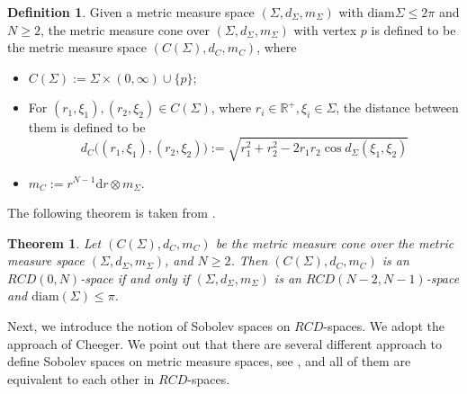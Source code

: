 \documentclass{article}
\newtheorem{theorem}{Theorem}[section]
\theoremstyle{remark}
\numberwithin{equation}{section}
\theoremstyle{definition}
\newtheorem{definition}{Definition}[section]
\begin{document}
     \begin{definition}
     	Given a metric measure space $(\Sigma,d_{\Sigma},m_{\Sigma})$ with $\mathrm{diam}\Sigma \le 2\pi$ and $N \ge 2$, the metric measure cone over $(\Sigma,d_{\Sigma},m_{\Sigma})$ with vertex $p$ is defined to be the metric measure space $(C(\Sigma),d_{C},m_{C})$, where
     	\begin{itemize}
     		\item $C(\Sigma) := \Sigma \times (0,\infty) \cup \{p\}$;
     		\item For $(r_{1},\xi_{1}),(r_{2},\xi_{2}) \in C(\Sigma)$, where $r_{i} \in \mathbb{R}^{+}, \xi_{i} \in \Sigma$, the distance between them is defined to be
     		\begin{equation}
     			d_{C}\big((r_{1},\xi_{1}),(r_{2},\xi_{2})\big) := \sqrt{r_{1}^{2} + r_{2}^{2} - 2r_{1}r_{2}\cos d_{\Sigma}(\xi_{1},\xi_{2})}
     		\end{equation}
     	    \item $m_{C} := r^{N-1}\mathrm{d}r \otimes m_{\Sigma}$.
     	\end{itemize}
     \end{definition}
     The following theorem is taken from \cite[Corollary 1.3]{Ketterer_2015}.
     \begin{theorem}\label{theorem_1_preliminaries}
     	Let $(C(\Sigma),d_{C},m_{C})$ be the metric measure cone over the metric measure space $(\Sigma,d_{\Sigma},m_{\Sigma})$, and $N \ge 2$. Then $(C(\Sigma),d_{C},m_{C})$ is an $RCD(0,N)$-space if and only if $(\Sigma,d_{\Sigma},m_{\Sigma})$ is an $RCD(N-2,N-1)$-space and $\mathrm{diam}(\Sigma) \le \pi$.
     \end{theorem}
 
     Next, we introduce the notion of Sobolev spaces on $RCD$-spaces. We adopt the approach of Cheeger\cite{Cheeger_1999}. We point out that there are several different approach to define Sobolev spaces on metric measure spaces, see \cite{Cheeger_1999,Ambrosio-Gigli-Savare_2014_2,Shanmugalingam_2000,Hajlasz_Koskela_2000}, and all of them are equivalent to each other in $RCD$-spaces.
     
\end{document}
